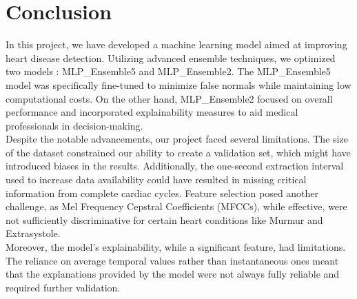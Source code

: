 \section{Conclusion}
In this project, we have developed a machine learning model aimed at improving heart disease detection.
Utilizing advanced ensemble techniques, we optimized two models : MLP\_Ensemble5 and MLP\_Ensemble2.
The MLP\_Ensemble5 model was specifically fine-tuned to minimize false normals while maintaining low computational costs.
On the other hand, MLP\_Ensemble2 focused on overall performance and incorporated explainability measures to aid medical professionals in decision-making.\\
Despite the notable advancements, our project faced several limitations. The size of the dataset constrained our ability to create a validation set,
which might have introduced biases in the results. Additionally, the one-second extraction interval used
to increase data availability could have resulted in missing critical information from complete cardiac cycles.
Feature selection posed another challenge, as Mel Frequency Cepstral Coefficients (MFCCs), while effective,
were not sufficiently discriminative for certain heart conditions like Murmur and Extrasystole.\\
Moreover, the model's explainability, while a significant feature, had limitations.
The reliance on average temporal values rather than instantaneous ones meant that the explanations provided by the model were not always fully
reliable and required further validation.

